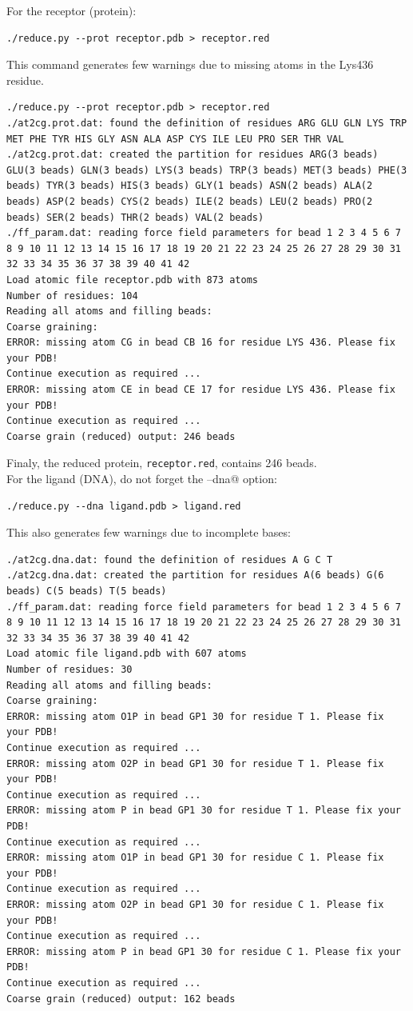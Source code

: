 \documentclass[12pt,a4paper]{article}
\begin{document}
For the receptor (protein): 
\begin{verbatim}
./reduce.py --prot receptor.pdb > receptor.red
\end{verbatim}
This command generates few warnings due to missing atoms in the Lys436 residue. 
\begin{verbatim}
./reduce.py --prot receptor.pdb > receptor.red
./at2cg.prot.dat: found the definition of residues ARG GLU GLN LYS TRP MET PHE TYR HIS GLY ASN ALA ASP CYS ILE LEU PRO SER THR VAL 
./at2cg.prot.dat: created the partition for residues ARG(3 beads) GLU(3 beads) GLN(3 beads) LYS(3 beads) TRP(3 beads) MET(3 beads) PHE(3 beads) TYR(3 beads) HIS(3 beads) GLY(1 beads) ASN(2 beads) ALA(2 beads) ASP(2 beads) CYS(2 beads) ILE(2 beads) LEU(2 beads) PRO(2 beads) SER(2 beads) THR(2 beads) VAL(2 beads) 
./ff_param.dat: reading force field parameters for bead 1 2 3 4 5 6 7 8 9 10 11 12 13 14 15 16 17 18 19 20 21 22 23 24 25 26 27 28 29 30 31 32 33 34 35 36 37 38 39 40 41 42 
Load atomic file receptor.pdb with 873 atoms 
Number of residues: 104
Reading all atoms and filling beads:
Coarse graining:
ERROR: missing atom CG in bead CB 16 for residue LYS 436. Please fix your PDB!
Continue execution as required ...
ERROR: missing atom CE in bead CE 17 for residue LYS 436. Please fix your PDB!
Continue execution as required ...
Coarse grain (reduced) output: 246 beads 
\end{verbatim}
Finaly, the reduced protein, {\tt receptor.red}, contains 246 beads.\\

For the ligand (DNA), do not forget the \verb@--dna@ option:
\begin{verbatim}
./reduce.py --dna ligand.pdb > ligand.red
\end{verbatim}
This also generates few warnings due to incomplete bases:
\begin{verbatim}
./at2cg.dna.dat: found the definition of residues A G C T 
./at2cg.dna.dat: created the partition for residues A(6 beads) G(6 beads) C(5 beads) T(5 beads) 
./ff_param.dat: reading force field parameters for bead 1 2 3 4 5 6 7 8 9 10 11 12 13 14 15 16 17 18 19 20 21 22 23 24 25 26 27 28 29 30 31 32 33 34 35 36 37 38 39 40 41 42 
Load atomic file ligand.pdb with 607 atoms 
Number of residues: 30
Reading all atoms and filling beads:
Coarse graining:
ERROR: missing atom O1P in bead GP1 30 for residue T 1. Please fix your PDB!
Continue execution as required ...
ERROR: missing atom O2P in bead GP1 30 for residue T 1. Please fix your PDB!
Continue execution as required ...
ERROR: missing atom P in bead GP1 30 for residue T 1. Please fix your PDB!
Continue execution as required ...
ERROR: missing atom O1P in bead GP1 30 for residue C 1. Please fix your PDB!
Continue execution as required ...
ERROR: missing atom O2P in bead GP1 30 for residue C 1. Please fix your PDB!
Continue execution as required ...
ERROR: missing atom P in bead GP1 30 for residue C 1. Please fix your PDB!
Continue execution as required ...
Coarse grain (reduced) output: 162 beads
\end{verbatim}
\end{document}

